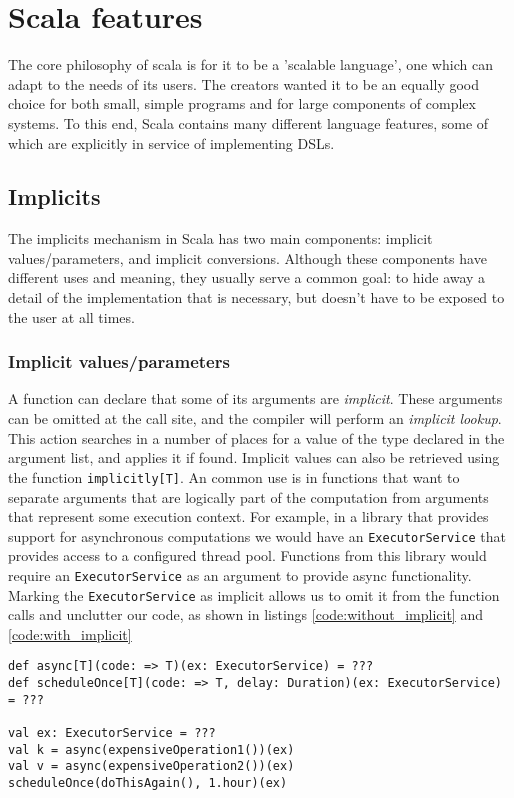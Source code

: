 \chapter{Scala features}
The core philosophy of scala is for it to be a 'scalable language', one which can adapt to the needs of its users. The creators wanted it to be an equally good choice for both small, simple programs and for large components of complex systems. To this end, Scala contains many different language features, some of which are explicitly in service of implementing DSLs.

\section{Implicits}

The implicits mechanism in Scala has two main components: implicit values/parameters, and implicit conversions. Although these components have different uses and meaning, they usually serve a common goal: to hide away a detail of the implementation that is necessary, but doesn't have to be exposed to the user at all times.

\subsection{Implicit values/parameters}

A function can declare that some of its arguments are {\it implicit}. These arguments can be omitted at the call site, and the compiler will perform an {\it implicit lookup}. This action searches in a number of places for a value of the type declared in the argument list, and applies it if found. Implicit values can also be retrieved using the function \texttt{implicitly[T]}. An common use is in functions that want to separate arguments that are logically part of the computation from arguments that represent some execution context. For example, in a library that provides support for asynchronous computations we would have an \texttt{ExecutorService} that provides access to a configured thread pool. Functions from this library would require an \texttt{ExecutorService} as an argument to provide async functionality. Marking the \texttt{ExecutorService} as implicit allows us to omit it from the function calls and unclutter our code, as shown in listings \ref{code:without_implicit} and \ref{code:with_implicit}

\begin{lstlisting}[caption=Code without implicits, label=code:without_implicit, float]
def async[T](code: => T)(ex: ExecutorService) = ???
def scheduleOnce[T](code: => T, delay: Duration)(ex: ExecutorService) = ???

val ex: ExecutorService = ???
val k = async(expensiveOperation1())(ex)
val v = async(expensiveOperation2())(ex)
scheduleOnce(doThisAgain(), 1.hour)(ex)
\end{lstlisting}

